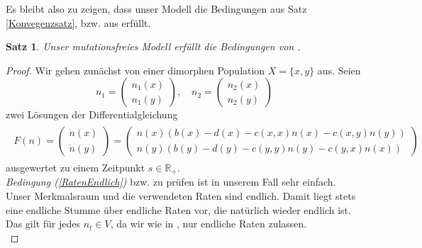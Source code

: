 \documentclass[11pt, a4paper, german]{article}
\theoremstyle{plain}
\newtheorem{satz}{Satz}[section]
\newcommand{\tvec}[2]{\begin{pmatrix}#1\\#2\end{pmatrix}}
\begin{document}
	Es bleibt also zu zeigen, dass unser Modell die Bedingungen aus Satz \ref{Konvegenzsatz}, bzw. aus \cite[Kap. 11 - \textbf{Theorem 2.1}]{ethier2009markov} erfüllt.

	\begin{satz}
		Unser mutationsfreies Modell erfüllt die Bedingungen von \cite[Kap. 11 - \textbf{Theorem 2.1}]{ethier2009markov}.
	\end{satz}
	
	\begin{proof}
		Wir gehen zunächst von einer dimorphen Population $ X = \{x,y\} $ aus. Seien
		\[ n_1 = \tvec{n_1(x)}{n_1(y)}, \quad n_2 = \tvec{n_2(x)}{n_2(y)} \]
		zwei Lösungen der Differentialgleichung
		\begin{align}
		\begin{split}
		F(n) = \tvec{\dot{n}(x)}{\dot{n}(y)} =  \tvec{n(x)(b(x)-d(x)-c(x,x)n(x)-c(x,y)n(y))}{n(y)(b(y)-d(y)-c(y,y)n(y)-c(y,x)n(x))}\label{nDGL}
		\end{split}
		\end{align}
		ausgewertet zu einem Zeitpunkt $ s \in \mathbb{R}_{+} $.\\
	
		\textit{Bedingung (\ref{RatenEndlich})} bzw. \cite[Kapitel 11 - \textbf{Thm 2.1} (2.6)]{ethier2009markov} zu prüfen ist in unserem Fall sehr einfach.
		Unser Merkmalsraum und die verwendeten Raten sind endlich. Damit liegt stets eine endliche Stumme über endliche Raten vor, die natürlich wieder endlich ist. Das gilt für jedes $ n_t \in V $, da wir wie in \cite{fournier2004microscopic}, nur endliche Raten zulassen.\\
	

\end{proof}
\end{document}
